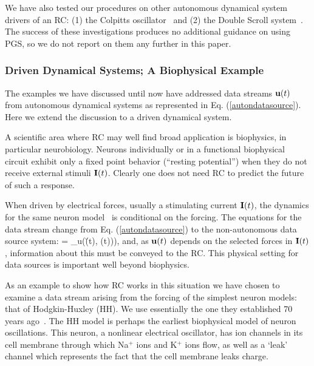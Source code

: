 \documentclass[12pt]{article}
\begin{document}

We have also tested our procedures on other autonomous dynamical system drivers of an RC: (1) the Colpitts oscillator~\cite{creveling08} and (2) the Double Scroll system~\cite{gaut96}. The success of these investigations produces no additional guidance on using PGS, so we do not report on them any further in this paper.

\subsubsection{Driven Dynamical Systems; A Biophysical Example}\label{biophys}

The examples we have discussed until now have addressed data streams $\mbox{$\bf{u}$}(t)$ from autonomous dynamical systems as represented in Eq. (\ref{autondatasource}). Here we extend the discussion to a driven dynamical system.

A scientific area where RC may well find broad application is biophysics, in particular neurobiology. Neurons individually or in a functional biophysical circuit exhibit only a fixed point behavior (``resting potential'') when they do not receive external stimuli $\mbox{$\bf{I}$}(t)$. Clearly one does not need RC to predict the future of such a response.

When driven by electrical forces, usually a stimulating current $\mbox{$\bf{I}$}(t)$, the dynamics for the same neuron model~\cite{jwu,willshaw} is conditional on the forcing. The equations for the data stream change from Eq. (\ref{autondatasource}) to the non-autonomous data source system:
\be 
{} = \F_u(\u(t), \I(t))),
\label{nonautondatasource}
\ee
and, as $\mbox{$\bf{u}$}(t)$ depends on the selected forces in $\mbox{$\bf{I}$}(t)$, information about this must be conveyed to the RC.
This physical setting for data sources is important well beyond biophysics.

As an example to show how RC works in this situation we have chosen to examine a data stream arising from the forcing of the simplest neuron models: that of Hodgkin-Huxley (HH). We use essentially the one they established 70 years ago~\cite{hodgkin1952quantitative,jwu,willshaw}.  The HH model is perhaps the earliest biophysical model of neuron oscillations. This neuron, a nonlinear electrical oscillator, has ion channels in its cell membrane through which Na$^+$ ions and K$^+$ ions flow, as well as a `leak' channel which represents the fact that the cell membrane leaks charge.
\end{document}
